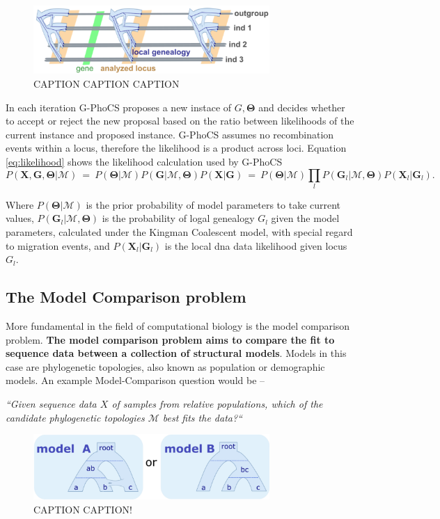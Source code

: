 \documentclass[11pt]{article}
\newcommand{\vect}[1]{\boldsymbol{\mathbf{#1}}}
\newcommand{\X}{\vect{X}}
\newcommand{\M}{\mathcal{M}}
\newcommand{\G}{\vect{G}}
\newcommand{\T}{\vect{\Theta}}
\newcommand{\1}{\mathbbm{1}}
\newcommand{\gp}{G-PhoCS }
\newenvironment{tightcenter}{%
  \setlength\topsep{0pt}
  \setlength\parskip{0pt}
  \begin{center}
}{%
  \end{center}
}
\begin{document}
\begin{figure}[h]
\centering
\includegraphics[width=0.8\textwidth]
{multiple_loci_across_sequence}
\caption{CAPTION CAPTION CAPTION}
\label{fig:clade_collapse_AB}
\end{figure}

In each iteration \gp proposes a new instace of $G, \T$ and decides whether to accept or reject the new proposal based on the ratio between likelihoods of the current instance and proposed instance. \gp assumes no recombination events within a locus, therefore the likelihood is a product across loci. Equation \ref{eq:likelihood} shows the likelihood calculation used by \gp
%
\begin{equation}\label{eq:likelihood}
 P(\X,\G,\T|\M) ~=~ P(\T|\M) P(\G|\M,\T) P(\X|\G) ~=~ P(\T|\M) \prod_l P(\G_l|\M,\T) P(\X_l|\G_l).
\end{equation}

Where $P(\T|\M)$ is the prior probability of model parameters to take current values, $P(\G_l|\M,\T)$ is the probability of logal genealogy $G_l$ given the model parameters, calculated under the Kingman Coalescent model, with special regard to migration events, and $P(\X_l|\G_l)$ is the local dna data likelihood given locus $G_l$.

\subsection{The Model Comparison problem}
More fundamental in the field of computational biology is the model comparison problem. \textbf{The model comparison problem aims to compare the fit to sequence data between a collection of structural models}. Models in this case are phylogenetic topologies, also known as population or demographic models. An example Model-Comparison question would be –\\
% 
\begin{tightcenter}{\textit{“Given sequence data $X$ of samples from
relative populations, which of the candidate phylogenetic topologies $\M$ best fits the data?“}}
\end{tightcenter}
\begin{figure}[h]
\centering
\includegraphics[width=0.8\textwidth]
{model_A__OR__model_b}
\caption{CAPTION CAPTION!}
\label{fig:model_A__OR__model_b}
\end{figure}
\end{document}
